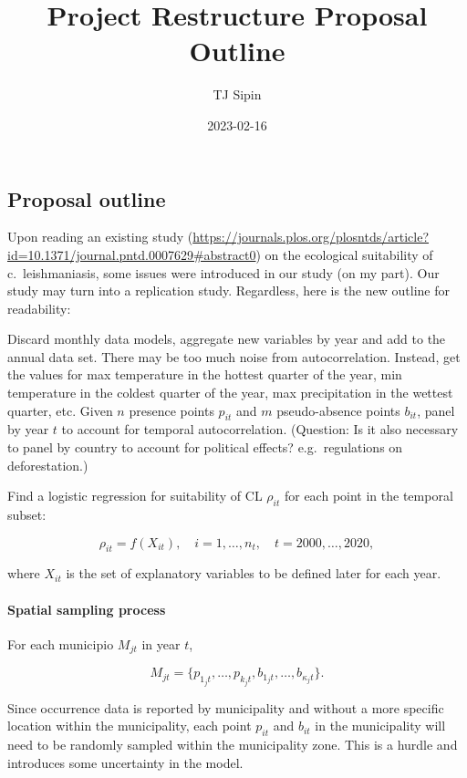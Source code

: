 \documentclass[
]{article}
\title{Project Restructure Proposal Outline}
\author{TJ Sipin}
\date{2023-02-16}
\begin{document}
\maketitle

\hypertarget{proposal-outline}{%
\subsection{Proposal outline}\label{proposal-outline}}

Upon reading an existing study
(\url{https://journals.plos.org/plosntds/article?id=10.1371/journal.pntd.0007629\#abstract0})
on the ecological suitability of c.~leishmaniasis, some issues were
introduced in our study (on my part). Our study may turn into a
replication study. Regardless, here is the new outline for readability:

Discard monthly data models, aggregate new variables by year and add to
the annual data set. There may be too much noise from autocorrelation.
Instead, get the values for max temperature in the hottest quarter of
the year, min temperature in the coldest quarter of the year, max
precipitation in the wettest quarter, etc. Given \(n\) presence points
\(p_{it}\) and \(m\) pseudo-absence points \(b_{it}\), panel by year
\(t\) to account for temporal autocorrelation. (Question: Is it also
necessary to panel by country to account for political effects?
e.g.~regulations on deforestation.)

Find a logistic regression for suitability of CL \(\rho_{it}\) for each
point in the temporal subset:

\[
\rho_{it} = f(X_{it}), \quad i = 1,\dots, n_t, \quad t=2000, \dots, 2020,
\]

where \(X_{it}\) is the set of explanatory variables to be defined later
for each year.

\hypertarget{spatial-sampling-process}{%
\paragraph{Spatial sampling process}\label{spatial-sampling-process}}

For each municipio \(M_{jt}\) in year \(t\),

\[
M_{jt} = \{p_{1_j t}, \dots, p_{k_j t}, b_{1_j t}, \dots, b_{\kappa_j t}\}.
\]

Since occurrence data is reported by municipality and without a more
specific location within the municipality, each point \(p_{it}\) and
\(b_{it}\) in the municipality will need to be randomly sampled within
the municipality zone. This is a hurdle and introduces some uncertainty
in the model.
\end{document}
